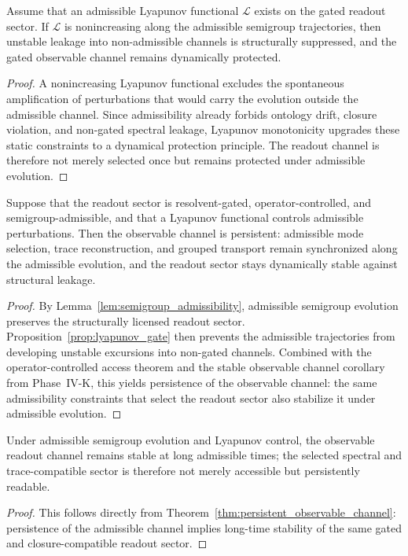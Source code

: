 \begin{proposition}\label{prop:lyapunov_gate}
Assume that an admissible Lyapunov functional $\mathcal L$ exists on the gated readout sector. If $\mathcal L$ is nonincreasing along the admissible semigroup trajectories, then unstable leakage into non-admissible channels is structurally suppressed, and the gated observable channel remains dynamically protected.
\end{proposition}
\begin{proof}
A nonincreasing Lyapunov functional excludes the spontaneous amplification of perturbations that would carry the evolution outside the admissible channel. Since admissibility already forbids ontology drift, closure violation, and non-gated spectral leakage, Lyapunov monotonicity upgrades these static constraints to a dynamical protection principle. The readout channel is therefore not merely selected once but remains protected under admissible evolution.
\end{proof}

\begin{theorem}\label{thm:persistent_observable_channel}
Suppose that the readout sector is resolvent-gated, operator-controlled, and semigroup-admissible, and that a Lyapunov functional controls admissible perturbations. Then the observable channel is persistent: admissible mode selection, trace reconstruction, and grouped transport remain synchronized along the admissible evolution, and the readout sector stays dynamically stable against structural leakage.
\end{theorem}
\begin{proof}
By Lemma~\ref{lem:semigroup_admissibility}, admissible semigroup evolution preserves the structurally licensed readout sector. Proposition~\ref{prop:lyapunov_gate} then prevents the admissible trajectories from developing unstable excursions into non-gated channels. Combined with the operator-controlled access theorem and the stable observable channel corollary from Phase~IV-K, this yields persistence of the observable channel: the same admissibility constraints that select the readout sector also stabilize it under admissible evolution.
\end{proof}

\begin{corollary}\label{cor:long_time_readout_stability}
Under admissible semigroup evolution and Lyapunov control, the observable readout channel remains stable at long admissible times; the selected spectral and trace-compatible sector is therefore not merely accessible but persistently readable.
\end{corollary}
\begin{proof}
This follows directly from Theorem~\ref{thm:persistent_observable_channel}: persistence of the admissible channel implies long-time stability of the same gated and closure-compatible readout sector.
\end{proof}

